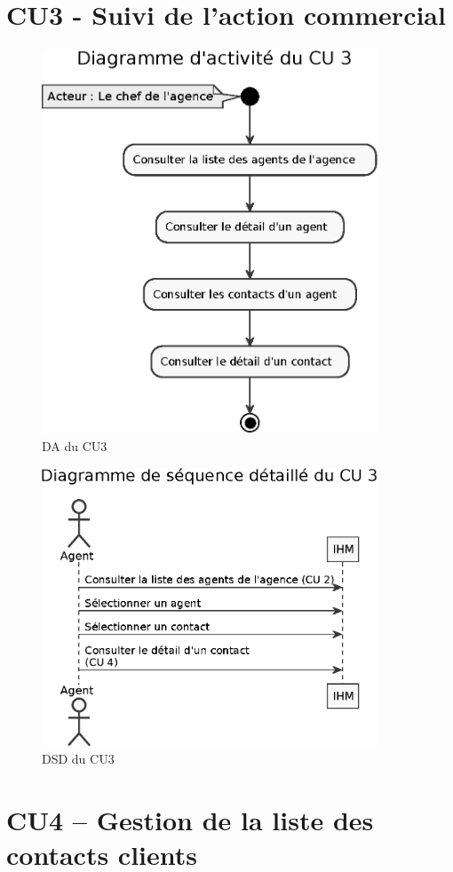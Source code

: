 \clearpage
\section{CU3 - Suivi de l’action commercial}

\begin{figure}[H]
\centering
\includegraphics[width=10cm]{figures/eps/DA_CU3.eps}
\caption{DA du CU3}
\end{figure}

\begin{figure}[H]
\centering
\includegraphics[width=10cm]{figures/eps/DSD_CU3.eps}
\caption{DSD du CU3}
\end{figure}

\clearpage
\section{CU4 – Gestion de la liste des contacts clients}

